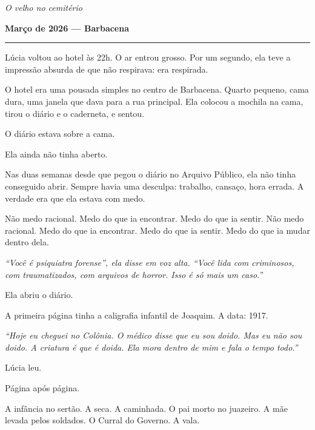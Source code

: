 
\noindent \textit{O velho no cemitério}

\noindent \textbf{Março de 2026 --- Barbacena}

\vspace{0.5em}\noindent\rule{\textwidth}{0.5pt}\vspace{0.5em}

\noindent Lúcia voltou ao hotel às 22h.
\noindent O ar entrou grosso. Por um segundo, ela teve a impressão absurda de que não respirava: era respirada.

\noindent O hotel era uma pousada simples no centro de Barbacena. Quarto pequeno, cama dura, uma janela que dava para a rua principal. Ela colocou a mochila na cama, tirou o diário e o caderneta, e sentou.

\noindent O diário estava sobre a cama.

\noindent Ela ainda não tinha aberto.

\noindent Nas duas semanas desde que pegou o diário no Arquivo Público, ela não tinha conseguido abrir. Sempre havia uma desculpa: trabalho, cansaço, hora errada. A verdade era que ela estava com medo.

\noindent Não medo racional.
Medo do que ia encontrar.
Medo do que ia sentir.
\noindent Não medo racional. Medo do que ia encontrar. Medo do que ia sentir. Medo do que ia mudar dentro dela.

\noindent \textit{\textquotedblleft{}Você é psiquiatra forense\textquotedblright{}\textit{, ela disse em voz alta. }\textquotedblleft{}Você lida com criminosos, com traumatizados, com arquivos de horror. Isso é só mais um caso.\textquotedblright{}}

\noindent Ela abriu o diário.

\noindent A primeira página tinha a caligrafia infantil de Joaquim. A data: 1917.

\noindent \textit{\textquotedblleft{}Hoje eu cheguei no Colônia. O médico disse que eu sou doido. Mas eu não sou doido. A criatura é que é doida. Ela mora dentro de mim e fala o tempo todo.\textquotedblright{}}

\noindent Lúcia leu.

\noindent Página após página.

\noindent A infância no sertão. A seca. A caminhada. O pai morto no juazeiro. A mãe levada pelos soldados. O Curral do Governo. A vala.

